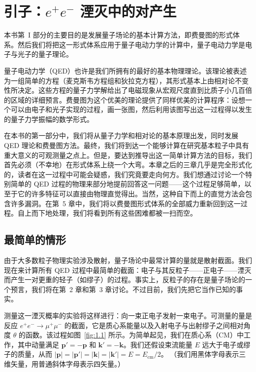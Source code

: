 \chapter{引子：$e^{+}e^{-}$ 湮灭中的对产生}

本书第~I 部分的主要目的是发展量子场论的基本计算方法，即费曼图的形式体系。然后我们将把这一形式体系应用于量子电动力学的计算中，量子电动力学是电子与光子的量子理论。

量子电动力学（QED）也许是我们所拥有的最好的基本物理理论。该理论被表述为一组简单的方程（麦克斯韦方程组和狄拉克方程），其形式基本上由相对论不变性所决定。这些方程的量子力学解给出了电磁现象从宏观尺度直到比质子小几百倍的区域的详细预言。费曼图为这个优美的理论提供了同样优美的计算程序：设想一个可以由电子和光子实现的过程，画一张图，然后利用该图写出这一过程得以发生的量子力学振幅的数学形式。

在本书的第一部分中，我们将从量子力学和相对论的基本原理出发，同时发展 QED 理论和费曼图方法。最终，我们将到达一个能够计算在研究基本粒子中具有重大意义的可观测量之点上。但是，要达到推导出这一简单计算方法的目标，我们首先必须（不幸地）在形式体系上绕一个大弯。本章之后的三章几乎是完全形式化的，读者在这一过程中可能会疑惑，我们究竟要走向何方。我们想通过讨论一个特别简单的 QED 过程的物理来部分地提前回答这一问题——这个过程足够简单，以至于它的许多特征可以直接由物理直觉得出。当然，这种自下而上的直觉方法会包含许多漏洞。在第~5 章中，我们将以费曼图形式体系的全部威力重新回到这一过程。自上而下地处理，我们将看到所有这些困难都被一扫而空。

\section{最简单的情形}

由于大多数粒子物理实验涉及散射，量子场论中最常计算的量就是散射截面。我们现在来计算所有 QED 过程中最简单的截面：电子与其反粒子——正电子——湮灭而产生一对更重的轻子（如缪子）的过程。事实上，反粒子的存在是量子场论的一个预言，我们将在第~2 章和第~3 章讨论。不过目前，我们先把它当作已知的事实。

测量这一湮灭概率的实验将这样进行：向一束正电子发射一束电子。可测量的量是反应 $e^{+}e^{-}\to\mu^{+}\mu^{-}$ 的截面，它是质心系能量以及入射电子与出射缪子之间相对角度 $\theta$ 的函数。该过程如图~\ref{fig:1.1} 所示。为简单起见，我们在质心系（CM）中工作，其中动量满足 $\mathbf{p}'=-\mathbf{p}$ 和 $\mathbf{k}'=-\mathbf{k}$。我们还假设束流能量 $E$ 远大于电子或缪子的质量，从而
$|\mathbf{p}|=|\mathbf{p}'|=|\mathbf{k}|=|\mathbf{k}'|=E=E_{\mathrm{cm}}/2$。
（我们用黑体字母表示三维矢量，用普通斜体字母表示四矢量。）

